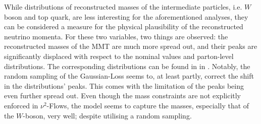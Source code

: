While distributions of reconstructed masses of the intermediate particles, i.e. $W$ boson and top quark, are less interesting for the aforementioned analyses, they can be considered a measure for the physical plausibility of the reconstructed neutrino momenta. For these two variables, two things are observed: the reconstructed masses of the MMT are much more spread out, and their peaks are significantly displaced with respect to the nominal values and parton-level distributions. The corresponding distributions can be found in  in . Notably, the random sampling of the Gaussian-Loss seems to, at least partly, correct the shift in the distributions' peaks. This comes with the limitation of the peaks being even further spread out. 
Even though the mass constraints are not explicitly enforced in $\nu^2$-Flows, the model seems to capture the masses, especially that of the $W$-boson, very well; despite utilising a random sampling.

